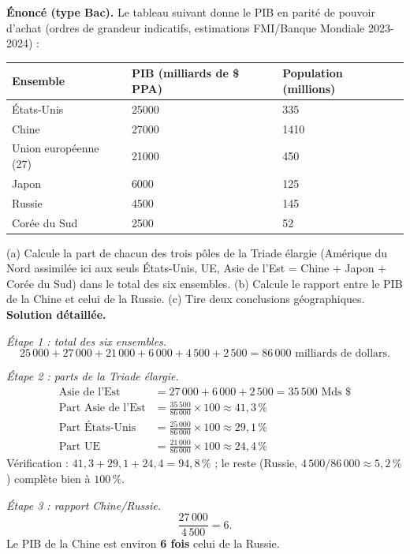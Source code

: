 \documentclass[11pt]{article}
\begin{document}
\begin{exoresolu}
\textbf{Énoncé (type Bac).} Le tableau suivant donne le PIB en parité de pouvoir d'achat (ordres de grandeur indicatifs, estimations FMI/Banque Mondiale 2023-2024) :

\begin{center}
\begin{tabularx}{\linewidth}{|l|X|X|}
\hline
\rowcolor{popblueL} \textbf{Ensemble} & \textbf{PIB (milliards de \$ PPA)} & \textbf{Population (millions)} \\
\hline
États-Unis & \num{25000} & 335 \\
\hline
Chine & \num{27000} & 1410 \\
\hline
Union européenne (27) & \num{21000} & 450 \\
\hline
Japon & \num{6000} & 125 \\
\hline
Russie & \num{4500} & 145 \\
\hline
Corée du Sud & \num{2500} & 52 \\
\hline
\end{tabularx}
\end{center}

(a) Calcule la part de chacun des trois pôles de la Triade élargie (Amérique du Nord assimilée ici aux seuls États-Unis, UE, Asie de l'Est = Chine + Japon + Corée du Sud) dans le total des six ensembles. (b) Calcule le rapport entre le PIB de la Chine et celui de la Russie. (c) Tire deux conclusions géographiques.
\tcblower
\textbf{Solution détaillée.}

\emph{Étape 1 : total des six ensembles.}
\[ 25\,000 + 27\,000 + 21\,000 + 6\,000 + 4\,500 + 2\,500 = 86\,000 \text{ milliards de dollars.} \]

\emph{Étape 2 : parts de la Triade élargie.}
\begin{align*}
\text{Asie de l'Est} &= 27\,000 + 6\,000 + 2\,500 = 35\,500 \text{ Mds \$} \\
\text{Part Asie de l'Est} &= \frac{35\,500}{86\,000} \times 100 \approx 41{,}3\,\% \\
\text{Part États-Unis} &= \frac{25\,000}{86\,000} \times 100 \approx 29{,}1\,\% \\
\text{Part UE} &= \frac{21\,000}{86\,000} \times 100 \approx 24{,}4\,\%
\end{align*}
Vérification : $41{,}3 + 29{,}1 + 24{,}4 = 94{,}8\,\%$ ; le reste (Russie, $4\,500/86\,000 \approx 5{,}2\,\%$) complète bien à $100\,\%$.

\emph{Étape 3 : rapport Chine/Russie.}
\[ \frac{27\,000}{4\,500} = 6. \]
Le PIB de la Chine est environ \textbf{6 fois} celui de la Russie.


\end{exoresolu}
\end{document}

